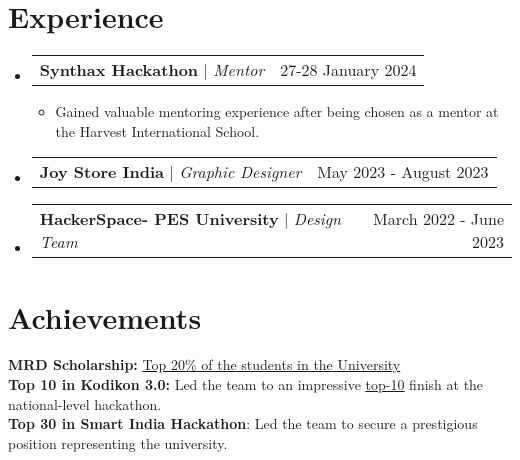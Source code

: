 \documentclass[letterpaper,11pt]{article}
\makeatletter
\newcommand{\resumeItem}[1]{
  \item\small{
    {#1 \vspace{-2pt}}
  }
}
\newcommand{\resumeProjectHeading}[2]{
    \item
    \begin{tabular*}{0.97\textwidth}{l@{\extracolsep{\fill}}r}
      \small#1 & #2 \\
    \end{tabular*}\vspace{-7pt}
}
\newcommand{\resumeSubHeadingListStart}{\begin{itemize}[leftmargin=0.15in, label={}]}
\newcommand{\resumeSubHeadingListEnd}{\end{itemize}}
\newcommand{\resumeItemListStart}{\begin{itemize}}
\newcommand{\resumeItemListEnd}{\end{itemize}\vspace{-5pt}}
\makeatother
\begin{document}
\section{Experience}
  \resumeSubHeadingListStart
        \resumeProjectHeading
          {\textbf{Synthax Hackathon} $|$ \footnotesize\emph{Mentor}}{27-28 January 2024}
          \resumeItemListStart
                \resumeItem{Gained valuable mentoring experience after being chosen as a mentor at the Harvest International School.}
            \resumeItemListEnd
        \resumeProjectHeading
            {\textbf{Joy Store India} $|$ {\footnotesize\emph{Graphic Designer}}}{May 2023 - August 2023}
        \resumeProjectHeading
            {\textbf{HackerSpace- PES University} $|$ {\footnotesize\emph{Design Team}}}{March 2022 - June 2023}
   \resumeSubHeadingListEnd 

\section{Achievements}
\begin{itemize}[leftmargin=0.15in, label={}]
    \small{\item{  
     \textbf{MRD Scholarship: }\href{https://drive.google.com/file/d/165MKp1oXSgvJpZoC17rnhxoq5BZP28Va/view?usp=sharing}{\underline{Top 20\%}{ of the students in the University}} \\
     \textbf{Top 10 in Kodikon 3.0: }{Led the team to an impressive }\href{https://drive.google.com/file/d/1zE2c2vQAUzSWOnhfeUJ2MOQWz7Egtn11/view?usp=sharing}{\underline{top-10}}{ finish at the national-level hackathon.} \\
     \textbf{Top 30 in Smart India Hackathon}{: Led the team to secure a prestigious position representing the university.} \\ 
    }}
 \end{itemize}

\end{document}
